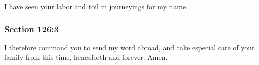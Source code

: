 		I have seen your labor and toil in journeyings for my name.


	\subsubsection{Section 126:3} %
		\label{DC126-3}

		I therefore command you to send my word abroad, and take especial care of your family from this time, henceforth and forever.  Amen.

